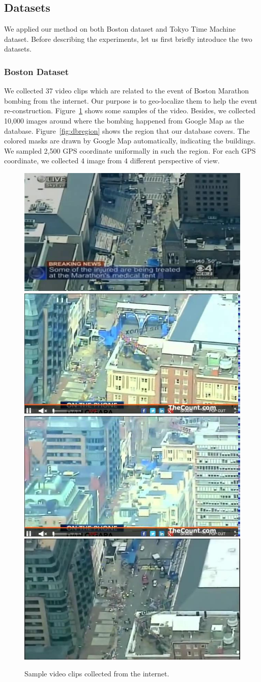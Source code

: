 \subsection{Datasets}
We applied our method on both Boston dataset and Tokyo Time Machine dataset. Before describing the experiments, let us first briefly introduce the two datasets. 

\subsubsection{Boston Dataset}
\par 
We collected 37 video clips which are related to the event of Boston Marathon bombing from the internet. Our purpose is to geo-localize them to help the event re-construction. Figure~\ref{fig:bostonvideo} shows some samples of the video. Besides, we collected 10,000 images around where the bombing happened from Google Map as the database. Figure~\ref{fig:dbregion} shows the region that our database covers. The colored masks are drawn by Google Map automatically, indicating the buildings. We sampled 2,500 GPS coordinate uniformally in such the region. For each GPS coordinate, we collected 4 image from 4 different perspective of view. 
\begin{figure}
\includegraphics[width=0.45\linewidth]{img/video_1}
\includegraphics[width=0.45\linewidth]{img/video_2}
\\[0.1cm]
\includegraphics[width=0.45\linewidth]{img/video_3}
\includegraphics[width=0.45\linewidth]{img/video_4}
\caption{Sample video clips collected from the internet.}
\label{fig:bostonvideo}
\end{figure}
